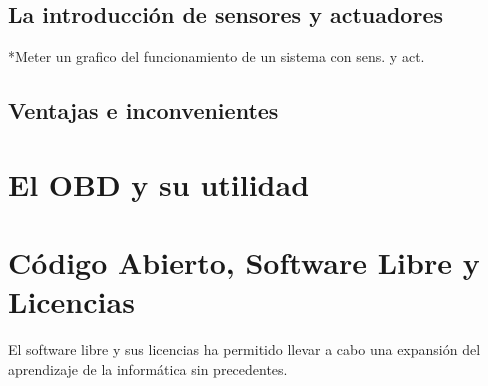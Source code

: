 \subsection{La introducción de sensores y actuadores}
*Meter un grafico del funcionamiento de un sistema con sens. y act.
\subsection{Ventajas e inconvenientes} 
\section{El OBD y su utilidad}
\section{Código Abierto, Software Libre y Licencias}

El software libre y sus licencias \cite{gplv3} ha permitido llevar a cabo una expansión del
aprendizaje de la informática sin precedentes.